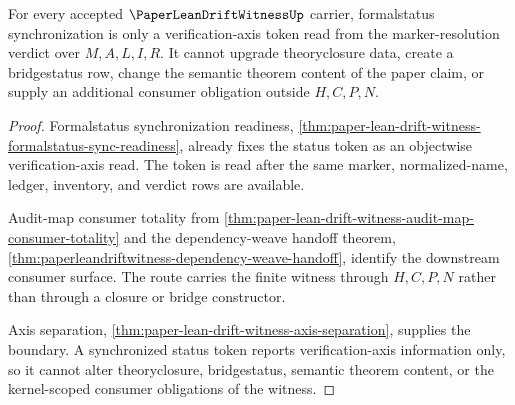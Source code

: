 \begin{theorem}
\label{thm:paperleandriftwitness-status-token-kernel-boundary}
For every accepted $\PaperLeanDriftWitnessUp$ carrier, formalstatus synchronization is only a verification-axis token read from the marker-resolution verdict over $M,A,L,I,R$. It cannot upgrade theoryclosure data, create a bridgestatus row, change the semantic theorem content of the paper claim, or supply an additional consumer obligation outside $H,C,P,N$.
\end{theorem}
\begin{proof}
Formalstatus synchronization readiness, \autoref{thm:paper-lean-drift-witness-formalstatus-sync-readiness}, already fixes the status token as an objectwise verification-axis read. The token is read after the same marker, normalized-name, ledger, inventory, and verdict rows are available.

Audit-map consumer totality from \autoref{thm:paper-lean-drift-witness-audit-map-consumer-totality} and the dependency-weave handoff theorem, \autoref{thm:paperleandriftwitness-dependency-weave-handoff}, identify the downstream consumer surface. The route carries the finite witness through $H,C,P,N$ rather than through a closure or bridge constructor.

Axis separation, \autoref{thm:paper-lean-drift-witness-axis-separation}, supplies the boundary. A synchronized status token reports verification-axis information only, so it cannot alter theoryclosure, bridgestatus, semantic theorem content, or the kernel-scoped consumer obligations of the witness.
\end{proof}

